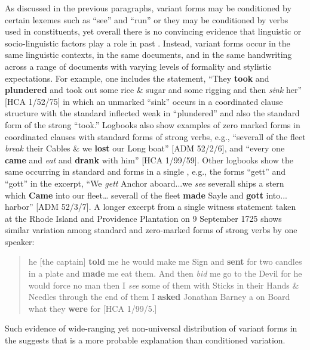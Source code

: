 As discussed in the previous paragraphs,  variant forms may be conditioned by certain lexemes such as “see” and “run” or they may be conditioned by verbs used in  constituents, yet overall there is no convincing evidence that linguistic or socio-linguistic factors play a role in past . Instead, variant forms occur in the same linguistic contexts, in the same documents, and in the same handwriting across a range of documents with varying levels of formality and stylistic expectations. For example, one  includes the statement, “They \textbf{took} and \textbf{plundered} and took out some rice \& sugar and some rigging and then \textit{sink} her” [HCA 1/52/75] in which an unmarked  “sink” occurs in a coordinated clause structure with the standard inflected weak  in  “plundered” and also the standard form of the strong   “took.” Logbooks also show examples of zero marked  forms in coordinated clauses with standard forms of strong verbs, e.g., “severall of the fleet \textit{break} their Cables \& we \textbf{lost} our Long boat” [ADM 52/2/6], and “every one \textbf{came} and \textit{eat} and \textbf{drank} with him” [HCA 1/99/59]. Other logbooks show the same  occurring in standard and  forms in a single , e.g., the  forms “gett” and “gott” in the excerpt, “We \textit{gett} Anchor aboard...we \textit{see} severall ships a stern which \textbf{Came} into our fleet… severall of the fleet \textbf{made} Sayle and \textbf{gott} into... harbor” [ADM 52/3/7]. A longer excerpt from a single witness statement taken at the Rhode Island and Providence Plantation on 9 September {1725} shows similar variation among standard and zero-marked forms of strong verbs by one speaker:

\begin{quotation}
he [the captain] \textbf{told} me he would make me Sign and \textbf{sent} for two candles in a plate and \textbf{made} me eat them. And then \textit{bid} me go to the Devil for he would force no man then I \textit{see} some of them with Sticks in their Hands \& Needles through the end of them I \textbf{asked} Jonathan Barney a  on Board what they \textbf{were} for [HCA 1/99/5.]
\end{quotation}

Such evidence of wide-ranging yet non-universal distribution of variant forms in the  suggests that  is a more probable explanation than conditioned variation.

